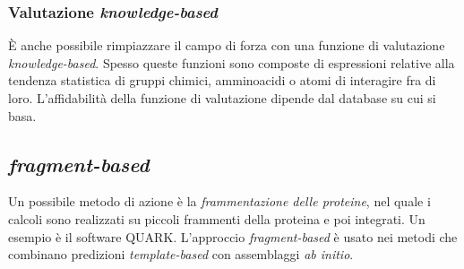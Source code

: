 \subsubsection{Valutazione \textit{knowledge-based}}
È anche possibile rimpiazzare il campo di forza con una funzione di valutazione \textit{knowledge-based}. Spesso queste funzioni sono composte di espressioni relative alla tendenza statistica di gruppi chimici, amminoacidi o atomi di interagire fra di loro. L'affidabilità della funzione di valutazione dipende dal database su cui si basa. 



\subsection{\textit{fragment-based}}

\par Un possibile metodo di azione è la \textit{frammentazione delle proteine}, nel quale i calcoli sono realizzati su piccoli frammenti della proteina e poi integrati. Un esempio è il software QUARK. L'approccio \textit{fragment-based} è usato nei metodi che combinano predizioni \textit{template-based} con assemblaggi \textit{ab initio}.


